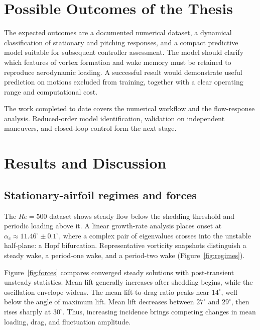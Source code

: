 

\section{Possible Outcomes of the Thesis}
The expected outcomes are a documented numerical dataset, a dynamical classification of stationary and pitching responses, and a compact predictive model suitable for subsequent controller assessment. The model should clarify which features of vortex formation and wake memory must be retained to reproduce aerodynamic loading. A successful result would demonstrate useful prediction on motions excluded from training, together with a clear operating range and computational cost.

The work completed to date covers the numerical workflow and the flow-response analysis. Reduced-order model identification, validation on independent maneuvers, and closed-loop control form the next stage.

\section{Results and Discussion}
\subsection{Stationary-airfoil regimes and forces}
The $Re=500$ dataset shows steady flow below the shedding threshold and periodic loading above it. A linear growth-rate analysis places onset at $\alpha_c\approx11.46^\circ\pm0.1^\circ$, where a complex pair of eigenvalues crosses into the unstable half-plane: a Hopf bifurcation. Representative vorticity snapshots distinguish a steady wake, a period-one wake, and a period-two wake (Figure~\ref{fig:regimes}).


Figure~\ref{fig:forces} compares converged steady solutions with post-transient unsteady statistics. Mean lift generally increases after shedding begins, while the oscillation envelope widens. The mean lift-to-drag ratio peaks near $14^\circ$, well below the angle of maximum lift. Mean lift decreases between $27^\circ$ and $29^\circ$, then rises sharply at $30^\circ$. Thus, increasing incidence brings competing changes in mean loading, drag, and fluctuation amplitude.

